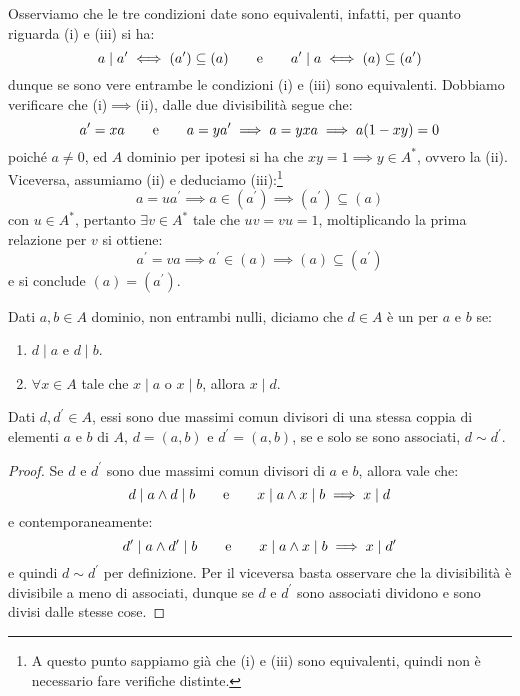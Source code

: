 \documentclass[11pt]{scrartcl}
\begin{document}
\begin{remark}
    Osserviamo che le tre condizioni date sono equivalenti, infatti, per quanto riguarda (i) e (iii) si ha:
    \[ a \mid a^{\prime} \iff (a^{\prime}) \subseteq (a) \qquad \text e \qquad a^{\prime}\mid a \iff (a) \subseteq (a^{\prime})
        \]
    dunque se sono vere entrambe le condizioni (i) e (iii) sono equivalenti. Dobbiamo verificare che (i)$\implies$(ii), dalle due divisibilità segue che:
    \[ a^{\prime} = xa \qquad \text e \qquad a = y a^{\prime} \implies a = yxa \implies a(1-xy) = 0
        \]
    poiché $a \ne 0$, ed $A$ dominio per ipotesi si ha che $xy = 1 \implies y \in A^*$, ovvero la (ii). Viceversa, assumiamo (ii) e deduciamo 
    (iii):\footnote{A questo punto sappiamo già che (i) e (iii) sono equivalenti, quindi non è necessario fare verifiche distinte.}
    \[ a = ua^{\prime} \implies a \in (a^{\prime}) \implies (a^{\prime}) \subseteq (a)
        \]
    con $u \in A^*$, pertanto $\exists v \in A^*$ tale che $uv = vu = 1$, moltiplicando la prima relazione per $v$ si ottiene:
    \[ a^{\prime} = va \implies a^{\prime} \in (a) \implies (a) \subseteq (a^{\prime})
        \]
    e si conclude $(a) = (a^{\prime})$.
\end{remark}

\begin{definition}
    Dati $a,b \in A$ dominio, non entrambi nulli, diciamo che $d \in A$ è un  per $a$ e $b$ se:
    \begin{enumerate}[(1)]
        \item $d \mid a$ e $d \mid b$.
        \item $\forall x \in A$ tale che $x \mid a$ o $x\mid b$, allora $x \mid d$.
    \end{enumerate}
\end{definition}

\begin{proposition}
    Dati $d,d^{\prime} \in A$, essi sono due massimi comun divisori di una stessa coppia di elementi $a$ e $b$ di $A$, $d=(a,b)$ e $d^{\prime} = (a,b)$, se e solo se sono associati, $d \sim d^{\prime}$.
\end{proposition}

\begin{proof}
Se $d$ e $d^{\prime}$ sono due massimi comun divisori di $a$ e $b$, allora vale che:
        \[ d \mid a \land d \mid b
        \qquad
        \text e
        \qquad
        x \mid a \land x \mid b \implies x \mid d
            \]
    e contemporaneamente:
        \[ d^{\prime} \mid a \land d^{\prime} \mid b
        \qquad
        \text e
        \qquad
        x \mid a \land x \mid b \implies x \mid d^{\prime}
            \]
    e quindi $d \sim d^{\prime}$ per definizione. Per il viceversa basta osservare che la divisibilità è divisibile a meno di associati, dunque se $d$ e $d^{\prime}$ sono associati dividono e sono divisi dalle stesse cose.
\end{proof}
\end{document}
